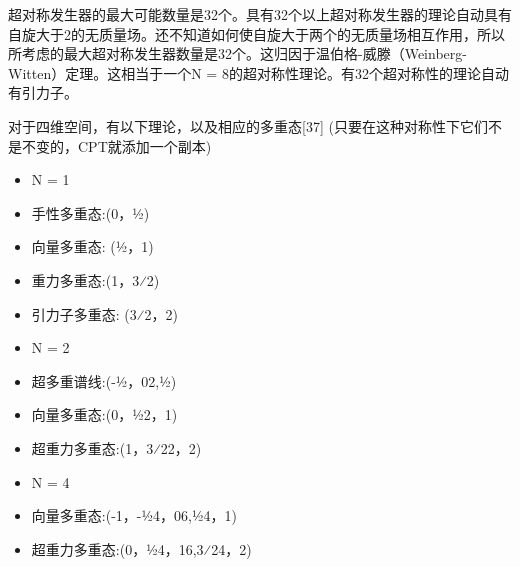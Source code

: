 超对称发生器的最大可能数量是32个。具有32个以上超对称发生器的理论自动具有自旋大于2的无质量场。还不知道如何使自旋大于两个的无质量场相互作用，所以所考虑的最大超对称发生器数量是32个。这归因于温伯格-威滕（Weinberg-Witten）定理。这相当于一个N = 8的超对称性理论。有32个超对称性的理论自动有引力子。

对于四维空间，有以下理论，以及相应的多重态[37] (只要在这种对称性下它们不是不变的，CPT就添加一个副本)
\begin{itemize}
\item N = 1
\item 手性多重态:(0，1⁄2)
\item 向量多重态: (1⁄2，1)
\item 重力多重态:(1，3⁄2)
\item 引力子多重态: (3⁄2，2)
\end{itemize}
\begin{itemize}
\item N = 2
\item 超多重谱线:(-1⁄2，02,1⁄2)
\item 向量多重态:(0，1⁄22，1)
\item 超重力多重态:(1，3⁄22，2)
\end{itemize}
\begin{itemize}
\item N = 4
\item 向量多重态:(-1，-1⁄24，06,1⁄24，1)
\item 超重力多重态:(0，1⁄24，16,3⁄24，2)
\end{itemize}

